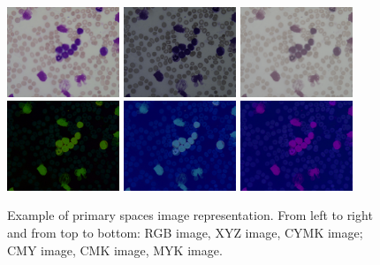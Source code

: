 \begin{figure}[!h]
	\centering
	\includegraphics[width=0.3\textwidth]{images/figcs_rgb}
	\includegraphics[width=0.3\textwidth]{images/figcs_xyz}
	\includegraphics[width=0.3\textwidth]{images/figcs_cmyk_all}
	\includegraphics[width=0.3\textwidth]{images/figcs_cmyk123}
	\includegraphics[width=0.3\textwidth]{images/figcs_cmyk124}
	\includegraphics[width=0.3\textwidth]{images/figcs_cmyk234}
	\caption[Example of primary spaces.]{\label{fig:colour_spaces}Example of primary spaces image representation. From left to right and from top to bottom: RGB image, XYZ image, CYMK image; CMY image, CMK image, MYK image.}
\end{figure}

